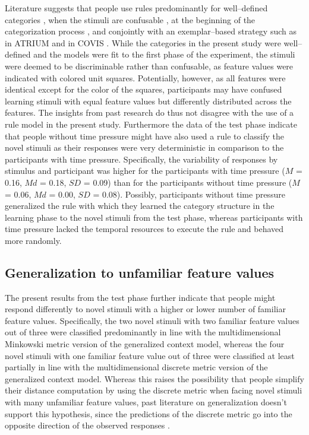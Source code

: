 \documentclass[a4paper,man,natbib]{apa6}
\begin{document}
Literature suggests that people use rules predominantly for well--defined categories \citep{restle1962selection, tom1968attention}, when the stimuli are confusable \citep{rouder2006comparing}, at the beginning of the categorization process \citep{rouder2006comparing}, and conjointly with an exemplar--based strategy such as in ATRIUM \citep{erickson1998rules} and in COVIS \citep{ashby2011covis}. While the categories in the present study were well--defined and the models were fit to the first phase of the experiment, the stimuli were deemed to be discriminable rather than confusable, as feature values were indicated with colored unit squares. Potentially, however, as all features were identical except for the color of the squares, participants may have confused learning stimuli with equal feature values but differently distributed across the features. The insights from past research do thus not disagree with the use of a rule model in the present study. Furthermore the data of the test phase indicate that people without time pressure might have also used a rule to classify the novel stimuli as their responses were very deterministic in comparison to the participants with time pressure. Specifically, the variability of responses by stimulus and participant was higher for the participants with time pressure ($M$ = 0.16, $Md$ = 0.18, $SD$ = 0.09) than for the participants without time pressure ($M$ = 0.06, $Md$ = 0.00, $SD$ = 0.08). Possibly, participants without time pressure generalized the rule with which they learned the category structure in the learning phase to the novel stimuli from the test phase, whereas participants with time pressure lacked the temporal resources to execute the rule and behaved more randomly.

\subsection{Generalization to unfamiliar feature values}
The present results from the test phase further indicate that people might respond differently to novel stimuli with a higher or lower number of familiar feature values. Specifically, the two novel stimuli with two familiar feature values out of three were classified predominantly in line with the multidimensional Minkowski metric version of the generalized context model, whereas the four novel stimuli with one familiar feature value out of three were classified at least partially in line with the multidimensional discrete metric version of the generalized context model. Whereas this raises the possibility that people simplify their distance computation by using the discrete metric when facing novel stimuli with many unfamiliar feature values, past literature on generalization doesn't support this hypothesis, since the predictions of the discrete metric go into the opposite direction of the observed responses \citep{erickson2002rule, denton2008rule}.
\end{document}
